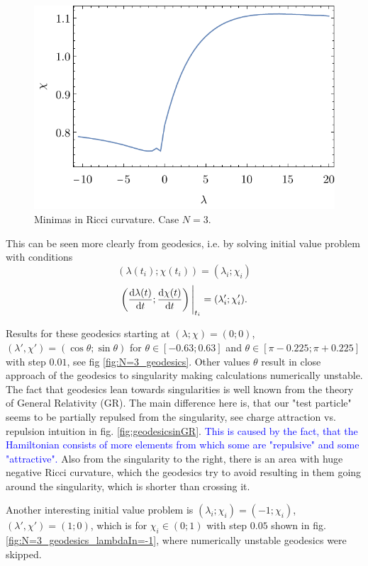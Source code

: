 \begin{figure}[h]
    \centering
    \includegraphics{../img/N=3_RicMinimas.pdf}
    \caption{Minimas in Ricci curvature. Case $N=3$.}
    \label{fig:N=3_RicMinimas}    
\end{figure}

This can be seen more clearly from geodesics, i.e. by solving initial value problem with conditions
$$(\lambda(t_i);\chi(t_i))=(\lambda_i;\chi_i)$$
$$\left(\frac{\mathrm{d} \lambda(t)}{\mathrm{d} t};\frac{\mathrm{d} \chi(t)}{\mathrm{d} t}\right)\Bigg|_{t_i}=(\lambda'_i;\chi'_i).$$

Results for these geodesics starting at $(\lambda;\chi)=(0;0)$, $(\lambda',\chi')=(\cos\theta;\sin\theta)$ for $\theta\in [-0.63;0.63]$ and $\theta\in [\pi-0.225;\pi+0.225]$ with step $0.01$, see fig \ref{fig:N=3_geodesics}. Other values $\theta$ result in close approach of the geodesics to singularity making calculations numerically unstable. The fact that geodesics lean towards singularities is well known from the theory of General Relativity (GR). The main difference here is, that our "test particle" seems to be partially repulsed from the singularity, see charge attraction vs. repulsion intuition in fig. \ref{fig:geodesicsinGR}. \textcolor{blue}{This is caused by the fact, that the Hamiltonian consists of more elements from which some are "repulsive" and some "attractive". } Also from the singularity to the right, there is an area with huge negative Ricci curvature, which the geodesics try to avoid resulting in them going around the singularity, which is shorter than crossing it.



Another interesting initial value problem is $(\lambda_i;\chi_i)=(-1;\chi_i)$, $(\lambda',\chi')=(1;0)$, which is for $\chi_i\in(0;1)$ with step $0.05$ shown in fig. \ref{fig:N=3_geodesics_lambdaIn=-1}, where numerically unstable geodesics were skipped.

